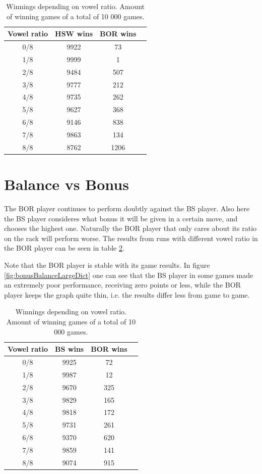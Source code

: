 \documentclass[a4paper, 12pt]{report}
\begin{document}
\begin{table}[h]
\centering
    \begin{tabular}{ | c | c | c | p{5cm} |}
    \hline
   	Vowel ratio & HSW wins & BOR wins \\ \hline
	0/8 & 9922 & 73 \\ \hline
    	1/8 & 9999  & 1 \\ \hline
    	2/8 & 9484 & 507 \\ \hline
    	3/8 & 9777 & 212 \\ \hline
	4/8 & 9735 & 262 \\ \hline
	5/8 & 9627 & 368 \\ \hline
	6/8 & 9146 & 838 \\ \hline
	7/8 & 9863 & 134 \\ \hline
	8/8 & 8762 & 1206 \\ \hline
    \end{tabular}
\caption{Winnings depending on vowel ratio. Amount of winning games of a total of 10 000 games.}
\label{tab:bor+hsw}
\end{table}


\section{Balance vs Bonus}
\label{sec:balanceBonus}
The BOR player continues to perform doubtly against the BS player. Also here the BS player consideres what bonus it will be given in a certain move, and chooses the highest one. Naturally the BOR player that only cares about its ratio on the rack will perform worse. The results from runs with different vowel ratio in the BOR player can be seen in table \ref{tab:bor+bs}.

Note that the BOR player is stable with its game results. In figure \ref{fig:bonusBalanceLargeDict} one can see that the BS player in some games made an extremely poor performance, receiving zero points or less, while the BOR player keeps the graph quite thin, i.e. the results differ less from game to game.

\begin{table}[h]
\centering
    \begin{tabular}{ | c | c | c |  p{5cm} |}
    \hline
   	Vowel ratio & BS wins & BOR wins \\ \hline
	0/8 & 9925 & 72 \\ \hline
    	1/8 & 9987 & 12 \\ \hline
    	2/8 & 9670 & 325 \\ \hline
    	3/8 & 9829 & 165 \\ \hline
	4/8 & 9818 & 172 \\ \hline
	5/8 & 9731 & 261 \\ \hline
	6/8 & 9370 & 620 \\ \hline
	7/8 & 9859 & 141 \\ \hline
	8/8 & 9074 & 915 \\ \hline
    \end{tabular}
\caption{Winnings depending on vowel ratio. Amount of winning games of a total of 10 000 games.}
\label{tab:bor+bs}
\end{table}
\end{document}
